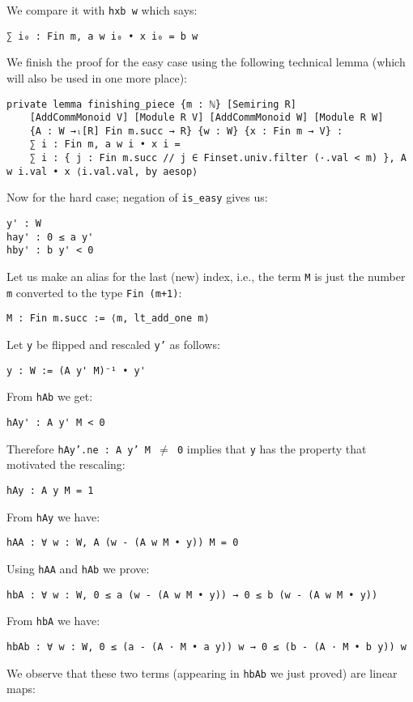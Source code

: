 \documentclass[]{article}
\renewcommand{\.}{\hskip .75pt}
\begin{document}
We compare it with \texttt{hxb w} which says:
\begin{lstlisting}
∑ i₀ : Fin m, a w i₀ • x i₀ = b w
\end{lstlisting} \pagebreak[2]
We finish the proof for the easy case using the following technical lemma (which will also be used in one more place):
\begin{lstlisting}
private lemma finishing_piece {m : ℕ} [Semiring R]
    [AddCommMonoid V] [Module R V] [AddCommMonoid W] [Module R W]
    {A : W →ₗ[R] Fin m.succ → R} {w : W} {x : Fin m → V} :
    ∑ i : Fin m, a w i • x i =
    ∑ i : { j : Fin m.succ // j ∈ Finset.univ.filter (·.val < m) }, A w i.val • x ⟨i.val.val, by aesop⟩ 
\end{lstlisting}
Now for the hard case; negation of \texttt{is\_easy} gives us:
\begin{lstlisting}
y' : W
hay' : 0 ≤ a y'
hby' : b y' < 0
\end{lstlisting}
Let us make an alias for the last (new) index, i.e., the term \texttt{M} is just
the number \texttt{m} converted to the type \texttt{Fin (m+1)}:
\begin{lstlisting}
M : Fin m.succ := ⟨m, lt_add_one m⟩
\end{lstlisting}
Let \texttt{y} be flipped and rescaled \texttt{y'} as follows:
\begin{lstlisting}
y : W := (A y' M)⁻¹ • y'
\end{lstlisting}
From \texttt{hAb} we get:
\begin{lstlisting}
hAy' : A y' M < 0
\end{lstlisting}
Therefore \texttt{hAy'.ne :~A y' M $\neq$ 0}
implies that \texttt{y} has the property that motivated the rescaling:
\begin{lstlisting}
hAy : A y M = 1
\end{lstlisting}
From \texttt{hAy} we have:
\begin{lstlisting}
hAA : ∀ w : W, A (w - (A w M • y)) M = 0
\end{lstlisting}
Using \texttt{hAA} and \texttt{hAb} we prove:
\begin{lstlisting}
hbA : ∀ w : W, 0 ≤ a (w - (A w M • y)) → 0 ≤ b (w - (A w M • y))
\end{lstlisting}
From \texttt{hbA} we have:
\begin{lstlisting}
hbAb : ∀ w : W, 0 ≤ (a - (A · M • a y)) w → 0 ≤ (b - (A · M • b y)) w
\end{lstlisting}
We observe that these two terms (appearing in \texttt{hbAb} we just proved) are linear maps:
\end{document}
